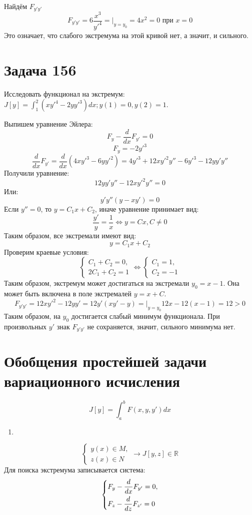 \documentclass[11pt]{article}
\begin{document}
Найдём \(F_{y'y'}\)
$$F_{y'y'} = 6\frac{x^3}{y'^4} =|_{y = y_0} = 4x^2 = 0 \text{ при } x = 0$$
Это означает, что слабого экстремума на этой кривой нет, а значит, и сильного.
\section{Задача 156}
\label{sec:orgeffe4b8}
Исследовать функционал на экстремум: \(J[y] = \int_1^2(xy'^4 - 2yy'^3)dx; y(1) = 0, y(2) = 1\).

Выпишем уравнение Эйлера:
$$F_y - \frac{d}{dx}F_{y'} = 0$$
$$F_y = -2y'^3$$
$$\frac{d}{dx}F_{y'} = \frac{d}{dx}(4xy'^3 - 6yy'^2) = 4y'^3 + 12xy'^2y'' - 6y'^3 - 12yy'y''$$
Получили уравнение:
$$12yy'y'' - 12xy'^2y'' = 0$$
Или:
$$y'y''(y - xy') = 0$$
Если \(y'' = 0\), то \(y = C_1x + C_2\), иначе уравнение принимает вид:
$$\frac{y'}y = \frac{1}x \Leftrightarrow y = Cx, C \neq 0$$
Таким образом, все экстремали имеют вид:
$$y = C_1x + C_2$$
Проверим краевые условия:
\begin{equation*}
\begin{cases}
C_1 + C_2 = 0, \\
2C_1 + C_2 = 1
\end{cases}
\Leftrightarrow
\begin{cases}
C_1 = 1, \\
C_2 = -1
\end{cases}
\end{equation*}
Таким образом, экстремум может достигаться на экстремали \(y_0 = x - 1\). Она может быть включена в поле экстремалей
\(y = x + C\).
$$F_{y'y'} = 12xy'^2 - 12yy' = 12y'(xy' - y) = |_{y = y_0} 12x - 12(x - 1) = 12 > 0$$
Таким образом, на \(y_0\) достигается слабый минимум функционала. При произвольных \(y'\) знак \(F_{y'y'}\) не сохраняется,
значит, сильного минимума нет.
\section{Обобщения простейшей задачи вариационного исчисления}
\label{sec:orgfbf1209}
$$J[y] = \int_a^bF(x, y, y')dx$$
\begin{enumerate}
\item 
\end{enumerate}
\begin{equation*}
\begin{cases}
y(x) \in M, \\
z(x) \in N
\end{cases}
\rightarrow J[y, z] \in \mathbb{R}
\end{equation*}
Для поиска экстремума записывается система:
\begin{equation*}
\begin{dcases}
F_y - \frac{d}{dx}F_{y'} = 0, \\
F_z - \frac{d}{dz}F_{z'} = 0
\end{dcases}
\end{equation*}
\end{document}
